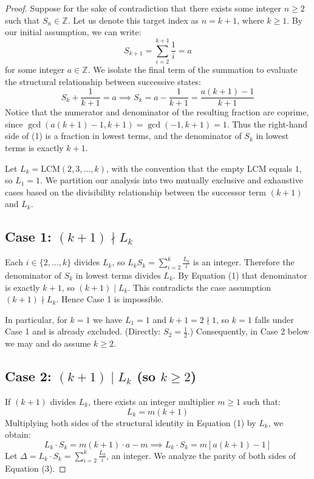 \documentclass[11pt,a4paper]{article}
\begin{document}
\begin{proof}
Suppose for the sake of contradiction that there exists some integer $n \geq 2$ such that $S_n \in \mathbb{Z}$. Let us denote this target index as $n = k+1$, where $k \geq 1$. By our initial assumption, we can write:
\[
S_{k+1} = \sum_{i=2}^{k+1} \frac{1}{i} = a
\]
for some integer $a \in \mathbb{Z}$. We isolate the final term of the summation to evaluate the structural relationship between successive states:
\begin{equation}
S_k + \frac{1}{k+1} = a \implies S_k = a - \frac{1}{k+1} = \frac{a(k+1) - 1}{k+1}
\end{equation}
Notice that the numerator and denominator of the resulting fraction are coprime, since $\gcd(a(k+1)-1, k+1) = \gcd(-1, k+1) = 1$. Thus the right-hand side of (1) is a fraction in lowest terms, and the denominator of $S_k$ in lowest terms is exactly $k+1$.

Let $L_k = \text{LCM}(2, 3, \dots, k)$, with the convention that the empty LCM equals $1$, so $L_1 = 1$. We partition our analysis into two mutually exclusive and exhaustive cases based on the divisibility relationship between the successor term $(k+1)$ and $L_k$.

\subsection*{Case 1: $(k+1) \nmid L_k$}
Each $i \in \{2,\dots,k\}$ divides $L_k$, so $L_k S_k = \sum_{i=2}^{k} \frac{L_k}{i}$ is an integer. Therefore the denominator of $S_k$ in lowest terms divides $L_k$. By Equation (1) that denominator is exactly $k+1$, so $(k+1) \mid L_k$. This contradicts the case assumption $(k+1) \nmid L_k$. Hence Case 1 is impossible.

In particular, for $k = 1$ we have $L_1 = 1$ and $k+1 = 2 \nmid 1$, so $k=1$ falls under Case 1 and is already excluded. (Directly: $S_2 = \tfrac12$.) Consequently, in Case 2 below we may and do assume $k \geq 2$.

\subsection*{Case 2: $(k+1) \mid L_k$ (so $k \ge 2$)}
If $(k+1)$ divides $L_k$, there exists an integer multiplier $m \geq 1$ such that:
\begin{equation}
L_k = m(k+1)
\end{equation}
Multiplying both sides of the structural identity in Equation (1) by $L_k$, we obtain:
\begin{equation}
L_k \cdot S_k = m(k+1) \cdot a - m \implies L_k \cdot S_k = m[a(k+1) - 1]
\end{equation}
Let $\Delta = L_k \cdot S_k = \sum_{i=2}^{k} \frac{L_k}{i}$, an integer. We analyze the parity of both sides of Equation (3).


\end{proof}
\end{document}
